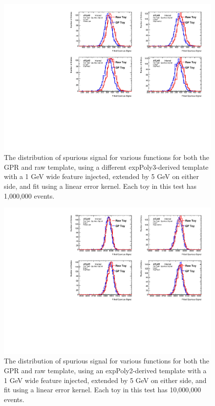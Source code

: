 \begin{figure} 
\begin{center}
  \includegraphics[width=\textwidth]{figures/background/gpr/validation/linear/ToyTest_FitSigVals_highpT_1M_Sig_1s}   
\caption{The distribution of spurious signal for various functions for both the GPR and raw template, using a different expPoly3-derived template with a 1 GeV wide feature injected, extended by 5 GeV on either side, and fit using a linear error kernel. Each toy in this test has 1,000,000 events.}
\label{fig:linearkernel_highpt_1M_Sig_1s}
\end{center}
\end{figure}

\begin{figure} 
\begin{center}
  \includegraphics[width=\textwidth]{figures/background/gpr/validation/linear/ToyTest_FitSigVals_lowpT_10M_Sig_1s}   
\caption{The distribution of spurious signal for various functions for both the GPR and raw template, using an expPoly2-derived template with a 1 GeV wide feature injected, extended by 5 GeV on either side, and fit using a linear error kernel. Each toy in this test has 10,000,000 events.}
\label{fig:linearkernel_lowpt_10M_Sig_1s}
\end{center}
\end{figure}

